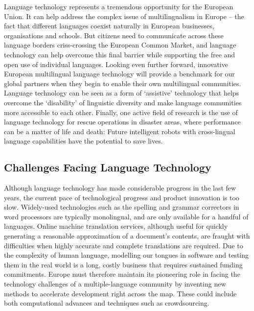 \documentclass[]{../metanetpaper}
\begin{document}
Language technology represents a tremendous opportunity for the European Union. It can help address the complex issue of multilingualism in Europe – the fact that different languages coexist naturally in European businesses, organisations and schools. But citizens need to communicate across these language borders criss-crossing the European Common Market, and language technology can help overcome this final barrier while supporting the free and open use of individual languages. Looking even further forward, innovative European multilingual language technology will provide a benchmark for our global partners when they begin to enable their own multilingual communities. Language technology can be seen as a form of ‘assistive’ technology that helps overcome the ‘disability’ of linguistic diversity and make language communities more accessible to each other. 
Finally, one active field of research is the use of language technology for rescue operations in disaster areas, where performance can be a matter of life and death: Future intelligent robots with cross-lingual language capabilities have the potential to save lives.

	\subsection{Challenges Facing Language Technology}
Although language technology has made considerable progress in the last few years, the current pace of technological progress and product innovation is too slow. Widely-used technologies such as the spelling and grammar correctors in word processors are typically monolingual, and are only available for a handful of languages. Online machine translation services, although useful for quickly generating a reasonable approximation of a document’s contents, are fraught with difficulties when highly accurate and complete translations are required. Due to the complexity of human language, modelling our tongues in software and testing them in the real world is a long, costly business that requires sustained funding commitments. Europe must therefore maintain its pioneering role in facing the technology challenges of a multiple-language community by inventing new methods to accelerate development right across the map. These could include both computational advances and techniques such as crowdsourcing.
\end{document}

